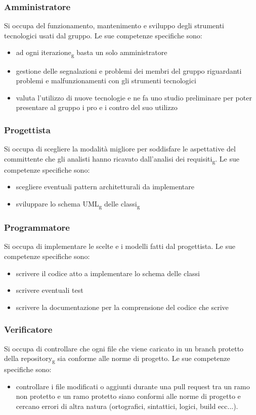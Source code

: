 \subsubsection{Amministratore}
Si occupa del funzionamento, mantenimento e sviluppo degli strumenti tecnologici usati dal gruppo. Le sue competenze specifiche sono:
\begin{itemize}
	\item ad ogni iterazione\textsubscript{g} basta un solo amministratore
	\item gestione delle segnalazioni e problemi dei membri del gruppo riguardanti problemi e malfunzionamenti con gli strumenti tecnologici
	\item valuta l'utilizzo di nuove tecnologie e ne fa uno studio preliminare per poter presentare al gruppo i pro e i contro del suo utilizzo
\end{itemize}

\subsubsection{Progettista}
Si occupa di scegliere la modalità migliore per soddisfare le aspettative del committente che gli analisti hanno ricavato dall'analisi dei requisiti\textsubscript{g}. Le sue competenze specifiche sono:
\begin{itemize}
	\item scegliere eventuali pattern architetturali da implementare
	\item sviluppare lo schema UML\textsubscript{g} delle classi\textsubscript{g}
\end{itemize}

\subsubsection{Programmatore}
Si occupa di implementare le scelte e i modelli fatti dal progettista. Le sue competenze specifiche sono:
\begin{itemize}
	\item scrivere il codice atto a implementare lo schema delle classi
	\item scrivere eventuali test
	\item scrivere la documentazione per la comprensione del codice che scrive
\end{itemize}

\subsubsection{Verificatore}
Si occupa di controllare che ogni file che viene caricato in un branch protetto della repository\textsubscript{g} sia conforme alle norme di progetto. Le sue competenze specifiche sono:
\begin{itemize}
	\item controllare i file modificati o aggiunti durante una pull request tra un ramo non protetto e un ramo protetto siano conformi alle norme di progetto e cercano errori di altra natura (ortografici, sintattici, logici, build ecc...).
\end{itemize}